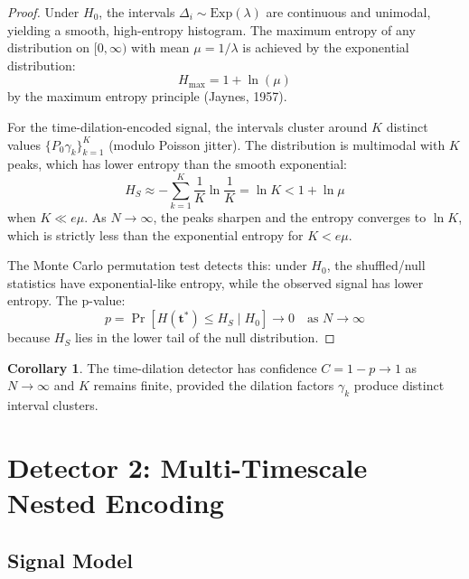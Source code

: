 \documentclass[11pt]{article}
\theoremstyle{definition}
\newtheorem{corollary}[theorem]{Corollary}
\begin{document}
\begin{proof}
Under $H_0$, the intervals $\Delta_i \sim \mathrm{Exp}(\lambda)$ are continuous and unimodal, yielding a smooth, high-entropy histogram. The maximum entropy of any distribution on $[0, \infty)$ with mean $\mu = 1/\lambda$ is achieved by the exponential distribution:
\begin{equation}
H_{\max} = 1 + \ln(\mu)
\end{equation}
by the maximum entropy principle (Jaynes, 1957).

For the time-dilation-encoded signal, the intervals cluster around $K$ distinct values $\{P_0 \gamma_k\}_{k=1}^K$ (modulo Poisson jitter). The distribution is multimodal with $K$ peaks, which has lower entropy than the smooth exponential:
\begin{equation}
H_S \approx -\sum_{k=1}^{K} \frac{1}{K} \ln\frac{1}{K} = \ln K < 1 + \ln \mu
\end{equation}
when $K \ll e \mu$. As $N \to \infty$, the peaks sharpen and the entropy converges to $\ln K$, which is strictly less than the exponential entropy for $K < e \mu$.

The Monte Carlo permutation test detects this: under $H_0$, the shuffled/null statistics have exponential-like entropy, while the observed signal has lower entropy. The p-value:
\begin{equation}
p = \Pr[H(\mathbf{t}^{\ast}) \le H_S \mid H_0] \to 0 \quad \text{as } N \to \infty
\end{equation}
because $H_S$ lies in the lower tail of the null distribution.
\end{proof}

\begin{corollary}
The time-dilation detector has confidence $C = 1 - p \to 1$ as $N \to \infty$ and $K$ remains finite, provided the dilation factors $\gamma_k$ produce distinct interval clusters.
\end{corollary}


\section{Detector 2: Multi-Timescale Nested Encoding}

\subsection{Signal Model}
\end{document}

